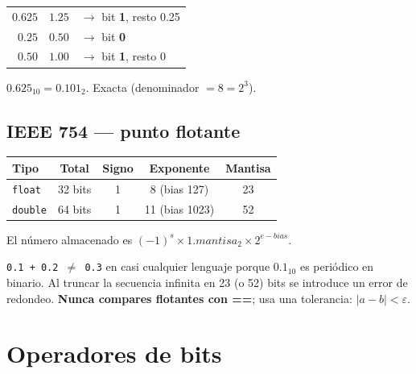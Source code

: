 \documentclass[12pt, oneside]{article}
\begin{document}
\begin{ejemplo}
\begin{center}
\begin{tabular}{r@{$\;\times 2 =\;$}ll}
  $0.625$ & $1.25$ & $\to$ bit \textbf{1}, resto 0.25 \\
  $0.25$  & $0.50$ & $\to$ bit \textbf{0} \\
  $0.50$  & $1.00$ & $\to$ bit \textbf{1}, resto 0 \\
\end{tabular}
\end{center}
$0.625_{10} = 0.101_2$.  Exacta (denominador $= 8 = 2^3$).\ \checkmark
\end{ejemplo}

\subsection{IEEE 754 — punto flotante}

\begin{center}
\begin{tabular}{lcccc}
  \toprule
  \textbf{Tipo} & \textbf{Total} & \textbf{Signo} & \textbf{Exponente} & \textbf{Mantisa} \\
  \midrule
  \texttt{float}  & 32 bits & 1 & 8  (bias 127)  & 23 \\
  \texttt{double} & 64 bits & 1 & 11 (bias 1023) & 52 \\
  \bottomrule
\end{tabular}
\end{center}

El número almacenado es $(-1)^s \times 1.mantisa_2 \times 2^{e - bias}$.

\begin{advertencia}
  \texttt{0.1 + 0.2 $\neq$ 0.3} en casi cualquier lenguaje porque $0.1_{10}$
  es periódico en binario.  Al truncar la secuencia infinita en 23 (o 52) bits
  se introduce un error de redondeo.  \textbf{Nunca compares flotantes con ==};
  usa una tolerancia: $|a - b| < \varepsilon$.
\end{advertencia}

\newpage

\section{Operadores de bits}
\end{document}
